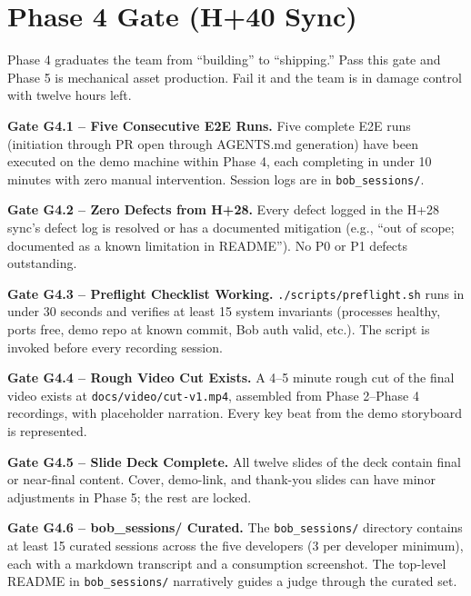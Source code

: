 \documentclass[11pt,letterpaper]{article}
\begin{document}
\section{Phase 4 Gate (H+40 Sync)}

Phase 4 graduates the team from ``building'' to ``shipping.'' Pass this gate and Phase 5 is mechanical asset production. Fail it and the team is in damage control with twelve hours left.

\begin{gate}
\textbf{Gate G4.1 -- Five Consecutive E2E Runs.} Five complete E2E runs (initiation through PR open through AGENTS.md generation) have been executed on the demo machine within Phase 4, each completing in under 10 minutes with zero manual intervention. Session logs are in \texttt{bob\_sessions/}.
\end{gate}

\begin{gate}
\textbf{Gate G4.2 -- Zero Defects from H+28.} Every defect logged in the H+28 sync's defect log is resolved or has a documented mitigation (e.g., ``out of scope; documented as a known limitation in README''). No P0 or P1 defects outstanding.
\end{gate}

\begin{gate}
\textbf{Gate G4.3 -- Preflight Checklist Working.} \texttt{./scripts/preflight.sh} runs in under 30 seconds and verifies at least 15 system invariants (processes healthy, ports free, demo repo at known commit, Bob auth valid, etc.). The script is invoked before every recording session.
\end{gate}

\begin{gate}
\textbf{Gate G4.4 -- Rough Video Cut Exists.} A 4--5 minute rough cut of the final video exists at \texttt{docs/video/cut-v1.mp4}, assembled from Phase 2--Phase 4 recordings, with placeholder narration. Every key beat from the demo storyboard is represented.
\end{gate}

\begin{gate}
\textbf{Gate G4.5 -- Slide Deck Complete.} All twelve slides of the deck contain final or near-final content. Cover, demo-link, and thank-you slides can have minor adjustments in Phase 5; the rest are locked.
\end{gate}

\begin{gate}
\textbf{Gate G4.6 -- bob\_sessions/ Curated.} The \texttt{bob\_sessions/} directory contains at least 15 curated sessions across the five developers (3 per developer minimum), each with a markdown transcript and a consumption screenshot. The top-level README in \texttt{bob\_sessions/} narratively guides a judge through the curated set.
\end{gate}
\end{document}

